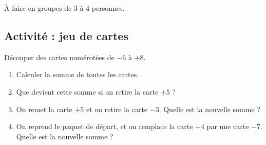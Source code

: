 
À faire en groupes de \( 3\) à \( 4\) personnes.

\subsection*{Activité : jeu de cartes}

Découper des cartes numérotées de \( -6\) à \( +8\).

\begin{enumerate}
    \item
        Calculer la somme de toutes les cartes.
    \item
        Que devient cette somme si on retire la carte \( +5\) ?
    \item
        On remet la carte \( +5\) et on retire la carte \( -3\). Quelle est la nouvelle somme ?
    \item
        On reprend le paquet de départ, et on remplace la carte \( +4\) par une carte \( -7\). Quelle est la nouvelle somme ?
\end{enumerate}
